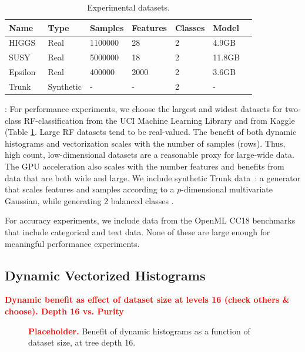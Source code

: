 \documentclass[sigconf]{acmart}
\newcommand{\TODO}[1]{\textbf{\textcolor{red}{#1}}}
\begin{document}
\begin{table}[t]
 \begin{centering}
 \small
\begin{tabular}{lllllll}
\hline
\textbf{Name} & \textbf{Type} & \textbf{Samples} & \textbf{Features} & \textbf{Classes}  & \textbf{Model}\\ \hline
HIGGS~\cite{higgs_280}  & Real & 1100000 & 28 & 2 & 4.9GB \\
SUSY~\cite{susy_279}  & Real & 	5000000 & 18 & 2 & 11.8GB\\
Epsilon~\cite{chang2011libsvm} & Real & 400000 & 2000 & 2 & 3.6GB\\
Trunk~\cite{trunk} & Synthetic & - & - & 2 & - \\
\hline
\end{tabular}
\vspace{5pt}
\caption{Experimental datasets.}
\label{tab:datasets}
\normalsize
\end{centering}
\end{table}


: For performance experiments, we choose the largest and widest datasets for two-class RF-classification from the UCI Machine Learning Library and from Kaggle (Table \ref{tab:datasets}. Large RF datasets tend to be real-valued. The benefit of both dynamic histograms and vectorization scales with the number of samples (rows). Thus, high count, low-dimensional datasets are a reasonable proxy for large-wide data. The GPU acceleration also scales with the number features and benefits from data that are both wide and large. We  include synthetic Trunk data~\cite{trunk}: a generator that scales features and samples according to a $p$-dimensional multivariate Gaussian, while generating 2 balanced classes \cite{tomita2020sparse}. 

For accuracy experiments, we include data from the OpenML CC18 benchmarks~\cite{bischl2017openml} that include categorical and text data. None of these are large enough for meaningful performance experiments.

\subsection{Dynamic Vectorized Histograms}
\label{sec:dyn}

\TODO{Dynamic benefit as effect of dataset size at levels 16 (check others \& choose). Depth 16 vs. Purity}

\begin{figure}[t]
    \centering
    \caption{\TODO{Placeholder.} Benefit of dynamic histograms as a function of dataset size, at tree depth 16.}
    \label{fig:dyn-vs-size}
\end{figure}
\end{document}
